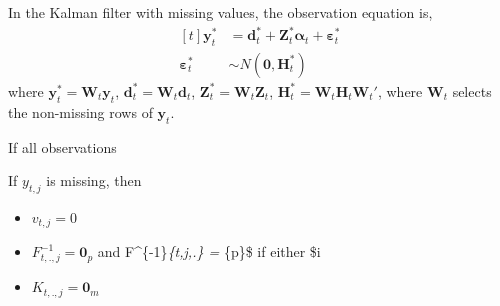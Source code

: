 \documentclass[]{book}
\providecommand{\tightlist}{%
  \setlength{\itemsep}{0pt}\setlength{\parskip}{0pt}}
\newcommand{\mat}[1]{\boldsymbol{#1}}
\renewcommand{\vec}[1]{\boldsymbol{#1}}
\renewcommand{\T}{'}
\begin{document}
In the Kalman filter with missing values, the observation equation is,
\[
\begin{aligned}[t]
\vec{y}^*_{t} &= \vec{d}^*_{t} + \mat{Z}^*_{t} \vec{\alpha}_t + \vec{\varepsilon}^*_t \\
\vec{\varepsilon}^*_t &\sim N(\vec{0}, \mat{H}^*_t)
\end{aligned}
\] where \(\vec{y}^*_{t} = \mat{W}_t \vec{y}_t\),
\(\vec{d}^*_t = \mat{W}_t \vec{d}_t\),
\(\mat{Z}^*_t = \mat{W}_t \mat{Z}_t\),
\(\mat{H}^*_t = \mat{W}_t \mat{H}_t \mat{W}_t\T\), where \(\mat{W}_t\)
selects the non-missing rows of \(\vec{y}_t\).

If all observations

If \(y_{t,j}\) is missing, then

\begin{itemize}
\tightlist
\item
  \(v_{t,j} = 0\)
\item
  \(F^{-1}_{t,.,j} = \vec{0}_{p}\) and F\^{}\{-1\}\emph{\{t,j,.\} =
  \vec{0}}\{p\}\$ if either \$i
\item
  \(K_{t,.,j} = \vec{0}_{m}\)
\end{itemize}
\end{document}
